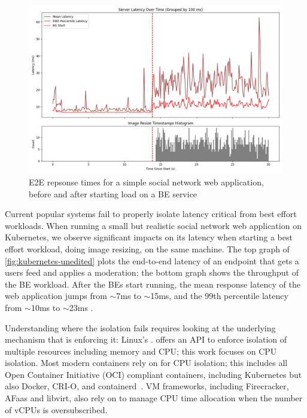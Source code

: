 \begin{figure}[t]
    \centering
    \includegraphics[width=\columnwidth]{graphs/kubernetes-unedited.png}
    \caption{E2E repsonse times for a simple social network web application,
    before and after starting load on a BE
    service}\label{fig:kubernetes-unedited}
\end{figure}

Current popular systems fail to properly isolate latency critical from best
effort workloads. When running a small but realistic social network web
application on Kubernetes, we observe significant impacts on its latency when
starting a best effort workload, doing image resizing, on the same machine. The
top graph of \autoref{fig:kubernetes-unedited} plots the end-to-end latency of
an endpoint that gets a users feed and applies a moderation; the bottom graph
shows the throughput of the BE workload. After the BEs start running, the mean
response latency of the web application jumps from $\sim$7ms to $\sim$15ms, and
the 99th percentile latency from $\sim$10ms to $\sim$23ms . 

Understanding where the isolation fails requires looking at the underlying
mechanism that is enforcing it: Linux's \cgroups{}. \cgroups{} offers an API to
enforce isolation of multiple resources including memory and CPU; this work
focuses on CPU isolation. Most modern containers rely on \cgroups{} for CPU
isolation; this includes all Open Container Initiative (OCI) compliant
containers, including Kubernetes but also Docker, CRI-O, and
containerd~\cite{oci-cgroups,docker-docs-cgroups,container-isolation-article}.
VM frameworks, including Firecracker, AFaas and libvirt, also rely on \cgroups{}
to manage CPU time allocation when the number of vCPUs is
oversubscribed.~\cite{firecracker-cgroups,afaas,libvirt-cgroups}

